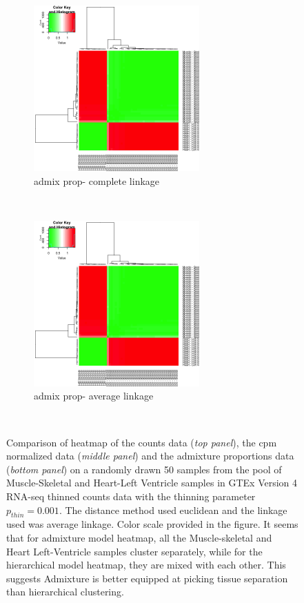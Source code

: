 \begin{figure}[ht]
     \begin{subfigure}[t]{0.5\textwidth}
        \centering
        \includegraphics[height=2.5in]{../plots/heart_muscle_admix_heatmap_complete.png}
        \caption{admix prop- complete linkage}
    \end{subfigure}%
    ~
    \begin{subfigure}[t]{0.5\textwidth}
        \centering
        \includegraphics[height=2.5in]{../plots/heart_muscle_admix_heatmap_average.png}
        \caption{admix prop- average linkage}
    \end{subfigure}\\

    \caption{Comparison of heatmap of the counts data (\textit{top panel}), the cpm normalized data (\textit{middle panel}) and the admixture proportions data (\textit{bottom panel}) on  a randomly drawn 50 samples from the pool of Muscle-Skeletal and Heart-Left Ventricle samples in GTEx Version 4 RNA-seq thinned counts data with the thinning parameter $p_{thin}=0.001$. The distance method used euclidean and the linkage used was average linkage. Color scale provided in the figure. It seems that for admixture model heatmap, all the Muscle-skeletal and Heart Left-Ventricle samples cluster separately, while for the hierarchical model heatmap, they are mixed with each other. This suggests Admixture is better equipped at picking tissue separation than hierarchical clustering.}
\end{figure}



